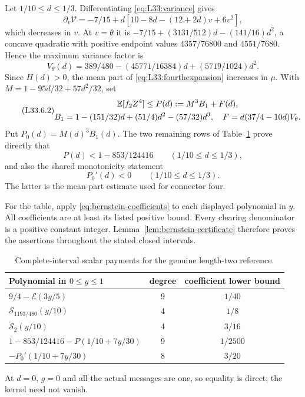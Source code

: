 Let $1/10\le d\le1/3$. Differentiating \eqref{eq:L33:variance} gives
\[
\partial_v\mathcal V=-7/15+d[10-8d-(12+2d)v+6v^2],
\]
which decreases in $v$. At $v=\theta$ it is
$-7/15+(3131/512)d-(141/16)d^2$, a concave quadratic with positive
endpoint values $4357/76800$ and $4551/7680$.
Hence the maximum variance factor is
\[
V_\theta(d)=389/480-(45771/16384)d+(5719/1024)d^2.
\]
Since $H(d)>0$, the mean part of \eqref{eq:L33:fourthexpansion}
increases in $\mu$. With $M=1-95d/32+57d^2/32$, set
\begin{equation}\tag{L33.6.2}\label{eq:L33:P}
\begin{gathered}
\mathbb E[f_2Z^4]\le P(d):=M^3B_1+F(d),\\
B_1=1-(151/32)d+(51/4)d^2-(57/32)d^3,\quad
F=d(37/4-10d)V_\theta.
\end{gathered}
\end{equation}
Put \(P_0(d)=M(d)^3B_1(d)\). The two remaining rows of
Table~\ref{tab:reference-synthesis:long-scalars} prove directly that
\begin{equation}\label{eq:reference-synthesis:long-high-payment}
 P(d)<1-853/124416\qquad(1/10\le d\le1/3),
\end{equation}
and also the shared monotonicity statement
\begin{equation}\label{eq:reference-synthesis:P0-decreasing}
 P_0'(d)<0\qquad(1/10\le d\le1/3).
\end{equation}
The latter is the mean-part estimate used for connector four.

For the table, apply \eqref{eq:bernstein-coefficients} to each displayed
polynomial in \(y\). All coefficients are at least its listed positive
bound. Every clearing denominator is a
positive constant integer. Lemma~\ref{lem:bernstein-certificate} therefore
proves the assertions throughout the stated closed intervals.
\begin{table}[htbp]\centering\small
\caption{Complete-interval scalar payments for the genuine length-two reference.}
\label{tab:reference-synthesis:long-scalars}
\begin{tabular}{@{}lcc@{}}
\toprule
Polynomial in \(0\le y\le1\)&degree&coefficient lower bound\\
\midrule
\(9/4-\mathcal E(3y/5)\)&9&\(1/40\)\\
\(\mathcal S_{1193/480}(y/10)\)&4&\(1/8\)\\
\(\mathcal S_2(y/10)\)&4&\(3/16\)\\
\(1-853/124416-P(1/10+7y/30)\)&9&\(1/2500\)\\
\(-P_0'(1/10+7y/30)\)&8&\(3/20\)\\
\bottomrule
\end{tabular}
\end{table} At $d=0$, $g=0$ and all the actual
messages are one, so equality is direct; the kernel need not vanish.
